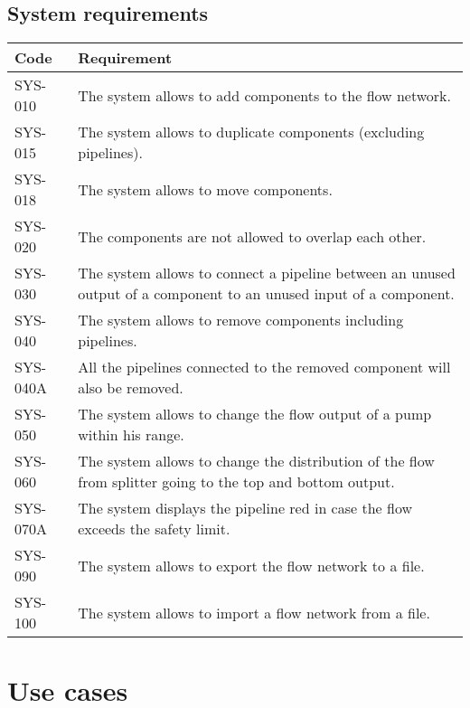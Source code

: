 \subsection{System requirements}
\begin{tabularx}{\textwidth}{|p{2cm}X|}\hline
Code & Requirement \\\hline
SYS-010 & The system allows to add components to the flow network.\\\hline
SYS-015 & The system allows to duplicate components (excluding pipelines).\\\hline
SYS-018 & The system allows to move components.\\\hline
SYS-020 & The components are not allowed to overlap each other.\\\hline
SYS-030 & The system allows to connect a pipeline between an unused output of a component to an unused input of a component.\\\hline
SYS-040 & The system allows to remove components including pipelines.\\\hline
SYS-040A & All the pipelines connected to the removed component will also be removed.\\\hline
SYS-050 & The system allows to change the flow output of a pump within his range.\\\hline
SYS-060 & The system allows to change the distribution of the flow from splitter going to the top and bottom output.\\\hline
SYS-070A & The system displays the pipeline red in case the flow exceeds the safety limit.\\\hline
SYS-090 & The system allows to export the flow network to a file.\\\hline
SYS-100 & The system allows to import a flow network from a file.\\\hline
\end{tabularx}

\section{Use cases}

